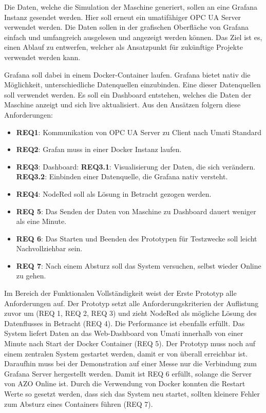 \documentclass[a4paper, 12pt, oneside, toc=listofnumbered, bibliography=totoc]{scrbook}
\begin{document}
		Die Daten, welche die Simulation der Maschine generiert, sollen an eine Grafana Instanz gesendet werden. Hier soll erneut ein umatifähiger OPC UA Server verwendet werden. Die Daten sollen in der grafischen Oberfläche von Grafana einfach und umfangreich ausgelesen und angezeigt werden können. Das Ziel ist es, einen Ablauf zu entwerfen, welcher als Ansatzpunkt für zukünftige Projekte verwendet werden kann. 
		
		Grafana soll dabei in einem Docker-Container laufen. Grafana bietet nativ die Möglichkeit, unterschiedliche Datenquellen einzubinden. Eine dieser Datenquellen soll verwendet werden. Es soll ein Dashboard entstehen, welches die Daten der Maschine anzeigt und sich live aktualisiert. Aus den Ansätzen folgern diese Anforderungen:
		
		\begin{itemize}
			\item \textbf{REQ1}: Kommunikation von OPC UA Server zu Client nach Umati Standard
			\item \textbf{REQ2}: Grafan muss in einer Docker Instanz laufen.
			\item \textbf{REQ3}: Dashboard:
			\subitem \textbf{REQ3.1}: Visualisierung der Daten, die sich verändern.
			\subitem \textbf{REQ3.2}: Einbinden einer Datenquelle, die Grafana nativ versteht.
			\item \textbf{REQ4}: NodeRed soll als Lösung in Betracht gezogen werden.
			
			\item \textbf{REQ 5}: Das Senden der Daten von Maschine zu Dashboard dauert weniger als eine Minute.
			
			\item \textbf{REQ 6}: Das Starten und Beenden des Prototypen für Testzwecke soll leicht Nachvollziehbar sein. 
			
			\item \textbf{REQ 7}: Nach einem Absturz soll das System versuchen, selbst wieder Online zu gehen. 
		\end{itemize}			
		
		Im Bereich der Funktionalen Vollständigkeit weist der Erste Prototyp alle Anforderungen auf. Der Prototyp setzt alle Anforderungskriterien der Auflistung zuvor um (REQ 1, REQ 2, REQ 3) und zieht NodeRed als mögliche Lösung des Datenflusses in Betracht (REQ 4). Die Performance ist ebenfalls erfüllt. Das System liefert Daten an das Web-Dashboard von Umati innerhalb von einer Minute nach Start der Docker Container (REQ 5). Der Prototyp muss noch auf einem zentralen System gestartet werden, damit er von überall erreichbar ist. Daraufhin muss bei der Demonstration auf einer Messe nur die Verbindung zum Grafana Server hergestellt werden. Damit ist REQ 6 erfüllt, solange die Server von AZO Online ist. Durch die Verwendung von Docker konnten die Restart Werte so gesetzt werden, dass sich das System neu startet, sollten kleinere Fehler zum Absturz eines Containers führen (REQ 7).
		
\end{document}
